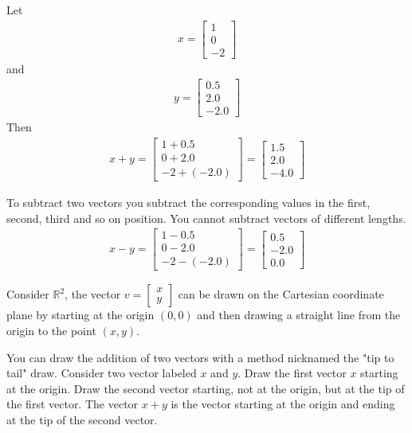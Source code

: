 \ex Let
\begin{align}
    x = \begin{bmatrix}
        1\\
        0\\
        -2
    \end{bmatrix}
\end{align}
and 
\begin{align}
    y = \begin{bmatrix}
        0.5\\
        2.0\\
        -2.0
    \end{bmatrix}
\end{align}
Then 
\begin{align}
    x + y = \begin{bmatrix}
        1 + 0.5\\
        0 + 2.0\\
        -2 + (-2.0)
    \end{bmatrix} = 
    \begin{bmatrix}
        1.5\\
        2.0\\
       -4.0
    \end{bmatrix}
\end{align}

To subtract two vectors you subtract the corresponding values in the first, second, third and so on position.
You cannot subtract vectors of different lengths. 
\begin{align}
    x - y = \begin{bmatrix}
        1 - 0.5\\
        0 - 2.0\\
        -2 - (-2.0)
    \end{bmatrix} = 
    \begin{bmatrix}
        0.5\\
        -2.0\\
        0.0
    \end{bmatrix}
\end{align}

Consider $\mathbb{R}^{2}$, the vector $v =  \begin{bmatrix} x \\ y \end{bmatrix}$ can be drawn on the Cartesian coordinate plane by starting at the origin $(0,0)$ and then drawing a straight line from the origin to the point $(x,y)$. 

You can draw the addition of two vectors with a method nicknamed the "tip to tail" draw. 
Consider two vector labeled $x$ and $y$. Draw the first vector $x$ starting at the origin. Draw the second vector starting, not at the origin, but at the tip of the first vector. The vector $x+y$ is the vector starting at the origin and ending at the tip of the second vector. 

